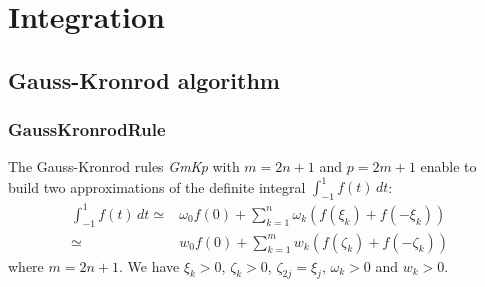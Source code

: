 \newpage
{}
\section{Integration}

\subsection{Gauss-Kronrod algorithm}


\subsubsection{GaussKronrodRule}


The Gauss-Kronrod rules {\itshape GmKp} with  $m=2n+1$ and $p=2m+1$ enable to build two approximations of the definite integral $\int_{-1}^1 f(t)\, dt$:
\begin{align}\label{GKapprox}
  \int_{-1}^1 f(t)\, dt \simeq & \omega_0f(0) + \sum_{k=1}^n \omega_k (f(\xi_k)+f(-\xi_k))\\
  \simeq & w_0f(0) + \sum_{k=1}^{m} w_k (f(\zeta_k)+f(-\zeta_k))
\end{align}
where $m=2n+1$. We have $\xi_k>0$,  $\zeta_k>0$, $\zeta_{2j}=\xi_j$, $\omega_k>0$ and $w_k>0$.


